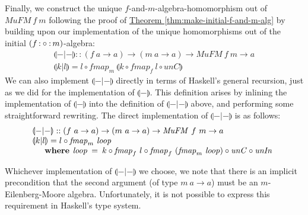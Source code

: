 \documentclass{jfp1}
\newcommand{\fold}[1]{\llparenthesis #1 \rrparenthesis}
\newcommand{\eFold}[2]{\llparenthesis #1|#2 \rrparenthesis}
\newcommand{\thmref}[1]{\hyperref[#1]{Theorem \ref*{#1}}}
\newcommand{\kw}[1]{\textbf{#1}}
\begin{document}
Finally, we construct the unique $f$-and-$m$-algebra-homomorphism out
of $\mathit{MuFM}~f~m$ following the proof of
\thmref{thm:make-initial-f-and-m-alg} by building upon our
implementation of the unique homomorphisms out of the initial $(f
\mathop{\mathord:\circ\mathord:} m)$-algebra:
\begin{displaymath}
  \begin{array}{l}
    \eFold{-}{-} :: (f~a \to a) \to (m~a \to a) \to \mathit{MuFM}~f~m \to a \\
    \eFold{k}{l} = l \circ \mathit{fmap}_m~\fold{k \circ \mathit{fmap}_f~l \circ \mathit{unC}}
  \end{array}
\end{displaymath}
We can also implement $\eFold{-}{-}$ directly in terms of Haskell's
general recursion, just as we did for the implementation of
$\fold{-}$. This definition arises by inlining the implementation of
$\fold{-}$ into the definition of $\eFold{-}{-}$ above, and performing
some straightforward rewriting. The direct implementation of
$\eFold{-}{-}$ is as follows:
\begin{displaymath}
  \begin{array}{l}
    \eFold{-}{-} :: (f~a \to a) \to (m~a \to a) \to \mathit{MuFM}~f~m \to a \\
    \eFold{k}{l} = l \circ \mathit{fmap}_m~\mathit{loop} \\
    \quad\begin{array}{r@{\hspace{0.4em}}l@{\hspace{0.5em}}c@{\hspace{0.5em}}l}
      \kw{where} & \mathit{loop} &=& k \circ \mathit{fmap}_f~l \circ \mathit{fmap}_f~(\mathit{fmap}_m~\mathit{loop}) \circ \mathit{unC} \circ \mathit{unIn}
    \end{array}
  \end{array}
\end{displaymath}

Whichever implementation of $\eFold{-}{-}$ we choose, we note that
there is an implicit precondition that the second argument (of type
$m~a \to a$) must be an $m$-Eilenberg-Moore algebra. Unfortunately, it is
not possible to express this requirement in Haskell's type system.

\end{document}

